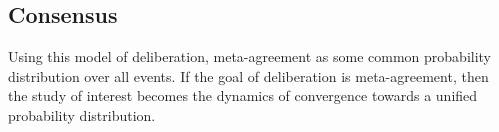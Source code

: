 \subsection{Consensus}
\label{sub: concensus DeGroot}
Using this model of deliberation, meta-agreement as some common probability distribution over all events. If the goal of deliberation is meta-agreement, then the study of interest becomes the dynamics of convergence towards a unified probability distribution.




